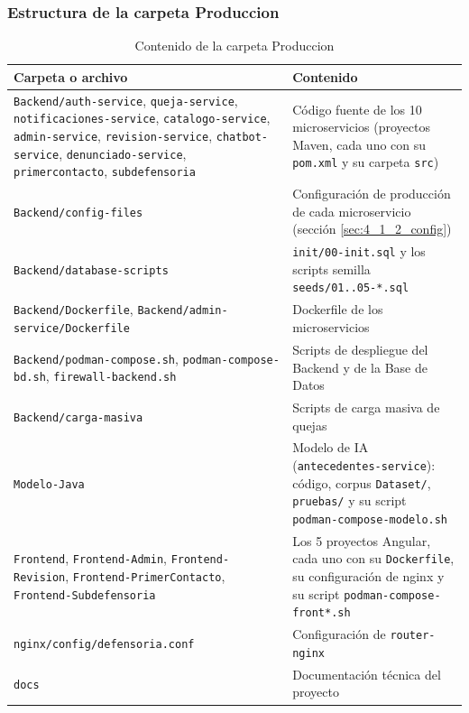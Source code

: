 \subsubsection{Estructura de la carpeta Produccion}
\begin{table}[H]
\centering
\caption{Contenido de la carpeta Produccion}
\small
\begin{tabular}{p{4.8cm}p{9.6cm}}
\toprule
\textbf{Carpeta o archivo} & \textbf{Contenido} \\
\midrule
\nolinkurl{Backend/auth-service}, \nolinkurl{queja-service}, \nolinkurl{notificaciones-service}, \nolinkurl{catalogo-service}, \nolinkurl{admin-service}, \nolinkurl{revision-service}, \nolinkurl{chatbot-service}, \nolinkurl{denunciado-service}, \nolinkurl{primercontacto}, \nolinkurl{subdefensoria} & Código fuente de los 10 microservicios (proyectos Maven, cada uno con su \texttt{pom.xml} y su carpeta \texttt{src}) \\
\nolinkurl{Backend/config-files} & Configuración de producción de cada microservicio (sección \ref{sec:4_1_2_config}) \\
\nolinkurl{Backend/database-scripts} & \texttt{init/00-init.sql} y los scripts semilla \texttt{seeds/01..05-*.sql} \\
\nolinkurl{Backend/Dockerfile}, \nolinkurl{Backend/admin-service/Dockerfile} & Dockerfile de los microservicios \\
\nolinkurl{Backend/podman-compose.sh}, \nolinkurl{podman-compose-bd.sh}, \nolinkurl{firewall-backend.sh} & Scripts de despliegue del Backend y de la Base de Datos \\
\nolinkurl{Backend/carga-masiva} & Scripts de carga masiva de quejas \\
\nolinkurl{Modelo-Java} & Modelo de IA (\texttt{antecedentes-service}): código, corpus \texttt{Dataset/}, \texttt{pruebas/} y su script \texttt{podman-compose-modelo.sh} \\
\nolinkurl{Frontend}, \nolinkurl{Frontend-Admin}, \nolinkurl{Frontend-Revision}, \nolinkurl{Frontend-PrimerContacto}, \nolinkurl{Frontend-Subdefensoria} & Los 5 proyectos Angular, cada uno con su \texttt{Dockerfile}, su configuración de nginx y su script \texttt{podman-compose-front*.sh} \\
\nolinkurl{nginx/config/defensoria.conf} & Configuración de \texttt{router-nginx} \\
\nolinkurl{docs} & Documentación técnica del proyecto \\
\bottomrule
\end{tabular}
\end{table}

